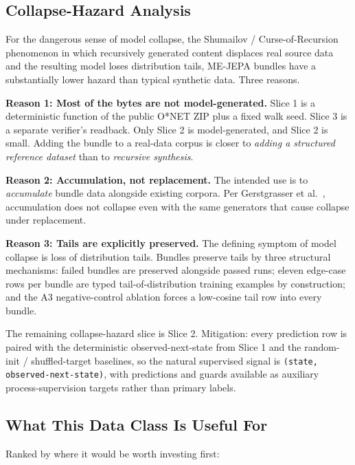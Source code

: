 \documentclass[10pt,twocolumn,letterpaper]{article}
\newcommand{\code}[1]{\texttt{\small #1}}
\begin{document}
\subsection{Collapse-Hazard Analysis}

For the dangerous sense of model collapse, the
Shumailov / Curse-of-Recursion phenomenon in which recursively
generated content displaces real source data and the resulting
model loses distribution tails, ME-JEPA bundles have a
substantially lower hazard than typical synthetic data. Three
reasons.

\textbf{Reason 1: Most of the bytes are not model-generated.}
Slice 1 is a deterministic function of the public O*NET ZIP plus
a fixed walk seed. Slice 3 is a separate verifier's readback. Only
Slice 2 is model-generated, and Slice 2 is small. Adding the bundle
to a real-data corpus is closer to \emph{adding a structured
reference dataset} than to \emph{recursive synthesis}.

\textbf{Reason 2: Accumulation, not replacement.} The intended use
is to \emph{accumulate} bundle data alongside existing corpora.
Per Gerstgrasser et al.\ \cite{gerstgrasser2024accumulate},
accumulation does not collapse even with the same generators that
cause collapse under replacement.

\textbf{Reason 3: Tails are explicitly preserved.} The defining
symptom of model collapse is loss of distribution tails. Bundles
preserve tails by three structural mechanisms: failed bundles are
preserved alongside passed runs; eleven edge-case rows per bundle
are typed tail-of-distribution training examples by construction;
and the A3 negative-control ablation forces a low-cosine tail row
into every bundle.

The remaining collapse-hazard slice is Slice 2. Mitigation: every
prediction row is paired with the deterministic observed-next-state
from Slice 1 and the random-init / shuffled-target baselines, so
the natural supervised signal is
\code{(state, observed-next-state)}, with predictions and guards
available as auxiliary process-supervision targets rather than
primary labels.

\subsection{What This Data Class Is Useful For}

Ranked by where it would be worth investing first:
\end{document}
